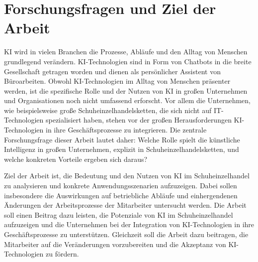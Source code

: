 
\section{Forschungsfragen und Ziel der Arbeit}

KI wird in vielen Branchen die Prozesse, Abläufe und den Alltag von Menschen grundlegend verändern. KI-Technologien sind in Form von Chatbots in die breite Gesellschaft getragen worden und dienen als persönlicher Assistent von Büroarbeiten. Obwohl KI-Technologien im Alltag von Menschen präsenter werden, ist die spezifische Rolle und der Nutzen von KI in großen Unternehmen und Organisationen noch nicht umfassend erforscht. Vor allem die Unternehmen, wie beispielsweise große Schuheinzelhandelsketten, die sich nicht auf IT-Technologien spezialisiert haben, stehen vor der großen Herausforderungen KI-Technologien in ihre Geschäftsprozesse zu integrieren. Die zentrale Forschungsfrage dieser Arbeit lautet daher: Welche Rolle spielt die künstliche Intelligenz in großen Unternehmen, explizit in Schuheinzelhandelsketten, und welche konkreten Vorteile ergeben sich daraus?

Ziel der Arbeit ist, die Bedeutung und den Nutzen von KI im Schuheinzelhandel zu analysieren und konkrete Anwendungsszenarien aufzuzeigen. Dabei sollen insbesondere die Auswirkungen auf betriebliche Abläufe und einhergendenen Änderungen der Arbeitsprozesse der Mitarbeiter untersucht werden. Die Arbeit soll einen Beitrag dazu leisten, die Potenziale von KI im Schuheinzelhandel aufzuzeigen und die Unternehmen bei der Integration von KI-Technologien in ihre Geschäftsprozesse zu unterstützen. Gleichzeit soll die Arbeit dazu beitragen, die Mitarbeiter auf die Veränderungen vorzubereiten und die Akzeptanz von KI-Technologien zu fördern.

\clearpage